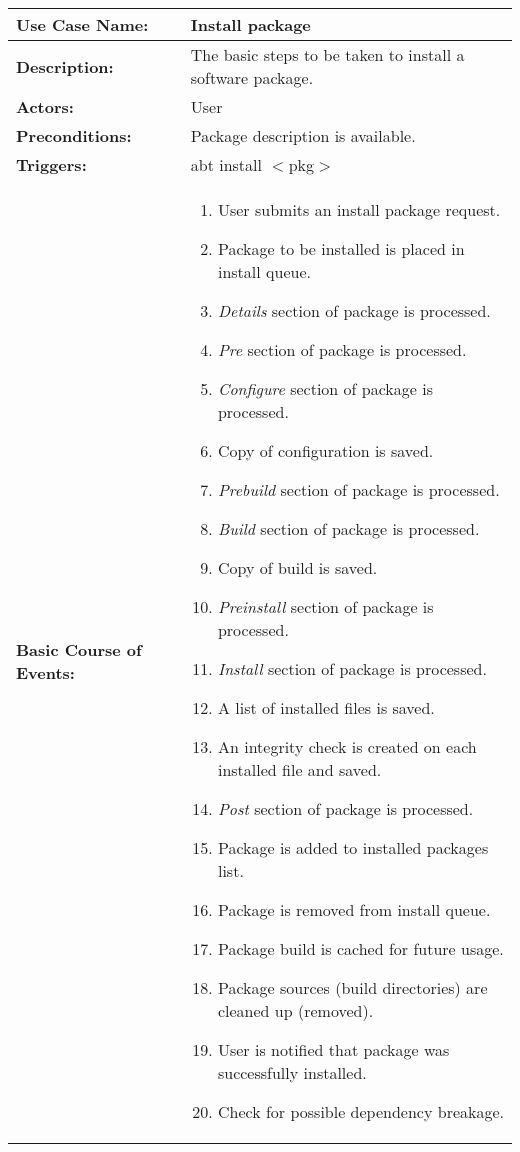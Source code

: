 
\begin{tabularx}{\linewidth}{|l|X|}
\hline
\textbf{Use Case Name:} & \textbf{Install package} \\
\hline
\textbf{Description:} & 
The basic steps to be taken to install a software package. \\
\hline
\textbf{Actors:} & User \\
\hline
\textbf{Preconditions:} & Package description is available. \\
\hline
\textbf{Triggers:} & abt install $<$pkg$>$ \\
\hline
\textbf{Basic Course of Events:} & 
\begin{minipage}{\linewidth} 
  \vspace{0.05em}
  \begin{enumerate}
    \item User submits an install package request.
    \item Package to be installed is placed in install queue.
    \item \emph{Details} section of package is processed.
    \item \emph{Pre} section of package is processed.
    \item \emph{Configure} section of package is processed.
    \item Copy of configuration is saved.
    \item \emph{Prebuild} section of package is processed.
    \item \emph{Build} section of package is processed.
    \item Copy of build is saved.
    \item \emph{Preinstall} section of package is processed.
    \item \emph{Install} section of package is processed.
    \item A list of installed files is saved.
    \item An integrity check is created on each installed file and saved.
    \item \emph{Post} section of package is processed.
    \item Package is added to installed packages list.
    \item Package is removed from install queue.
    \item Package build is cached for future usage.
    \item Package sources (build directories) are cleaned up (removed).
    \item User is notified that package was successfully installed.
    \item Check for possible dependency breakage.
  \end{enumerate}
  \vspace{0.05em}
\end{minipage}
\\
\hline
\end{tabularx}

